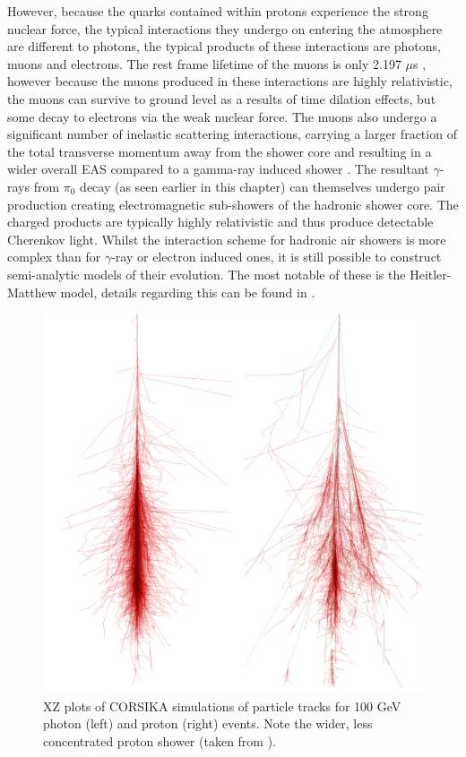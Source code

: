 However, because the quarks contained within protons experience the strong nuclear force, the typical interactions they undergo on entering the atmosphere are different to photons, the typical products of these interactions are photons, muons and electrons. The rest frame lifetime of the muons is only 2.197 $\mu$s \cite{pdg}, however because the muons produced in these interactions are highly relativistic, the muons can survive to ground level as a results of time dilation effects, but some decay to electrons via the weak nuclear force. The muons also undergo a significant number of inelastic scattering interactions, carrying a larger fraction of the total transverse momentum away from the shower core and resulting in a wider overall EAS compared to a gamma-ray induced shower \cite{tomthesis}.  The resultant $\gamma$-rays from $\pi_0$ decay (as seen earlier in this chapter) can themselves undergo pair production creating electromagnetic sub-showers of the hadronic shower core. The charged products are typically highly relativistic and thus produce detectable Cherenkov light.  Whilst the interaction scheme for hadronic air showers is more complex than for $\gamma$-ray or electron induced ones, it is still possible to construct semi-analytic models of their evolution. The most notable of these is the Heitler-Matthew model, details regarding this can be found in \cite{heitler}.


\begin{figure}
\begin{center}  

\includegraphics[width=0.5\columnwidth,trim=4 4 30 4,clip]{figures/showers.png}
 
\caption{XZ plots of CORSIKA simulations of particle tracks for 100 GeV photon (left) and proton (right) events. Note the wider, less concentrated proton shower (taken from \cite{corskplot}).}
\label{fig:image2}
\end{center}
\end{figure}
